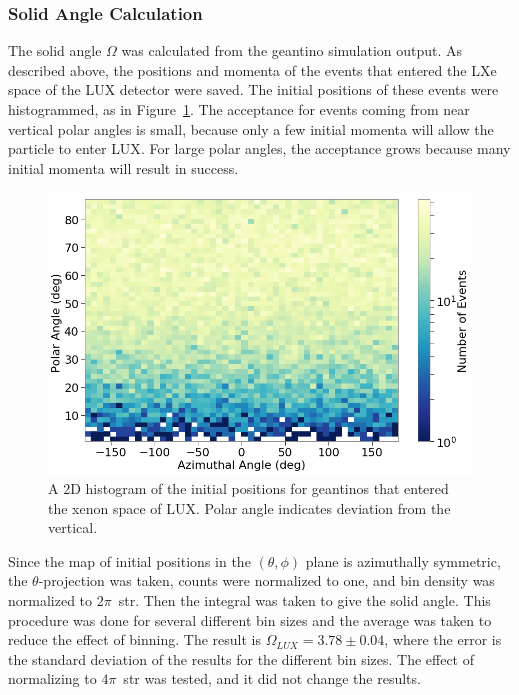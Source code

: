 \subsubsection{Solid Angle Calculation}
The solid angle $\Omega$ was calculated from the geantino simulation output. As described above, the positions and momenta of the events that entered the \ac{LXe} space of the \ac{LUX} detector were saved. The initial positions of these events were histogrammed, as in Figure~\ref{fig:skymap}. The acceptance for events coming from near vertical polar angles is small, because only a few initial momenta will allow the particle to enter \ac{LUX}. For large polar angles, the acceptance grows because many initial momenta will result in success. 

\begin{figure}[htbp]
\begin{center}
\includegraphics[width=\textwidth]{figures/lips/skymap.png}
\caption{A 2D histogram of the initial positions for geantinos that entered the xenon space of \acs{LUX}. Polar angle indicates deviation from the vertical. }
\label{fig:skymap}
\end{center}
\end{figure}

Since the map of initial positions in the $(\theta, \phi)$ plane is azimuthally symmetric, the $\theta$-projection was taken, counts were normalized to one, and bin density was normalized to $2\pi$~str. Then the integral was taken to give the solid angle. This procedure was done for several different bin sizes and the average was taken to reduce the effect of binning. The result is $\Omega_{LUX} = 3.78 \pm 0.04$, where the error is the standard deviation of the results for the different bin sizes. The effect of normalizing to $4\pi$~str was tested, and it did not change the results. 

